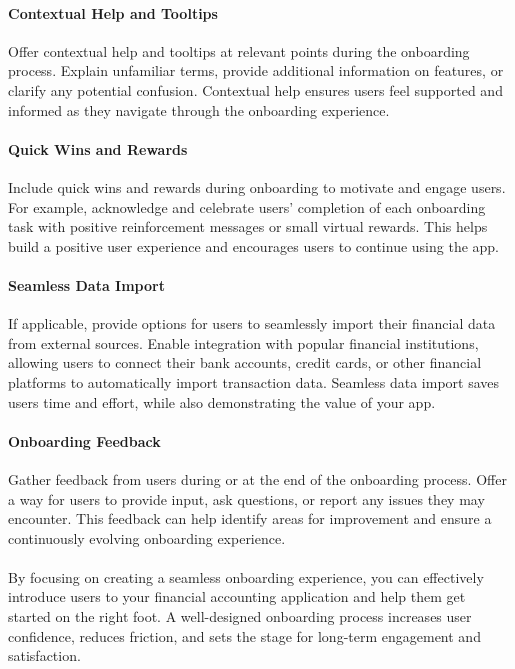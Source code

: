\paragraph{Contextual Help and Tooltips}
Offer contextual help and tooltips at relevant points during the onboarding process. 
Explain unfamiliar terms, provide additional information on features, or clarify any potential confusion. Contextual 
help ensures users feel supported and informed as they navigate through the onboarding experience.

\paragraph{Quick Wins and Rewards}
Include quick wins and rewards during onboarding to motivate and engage users. For example, 
acknowledge and celebrate users' completion of each onboarding task with positive reinforcement messages or small 
virtual rewards. This helps build a positive user experience and encourages users to continue using the app.

\paragraph{Seamless Data Import}
If applicable, provide options for users to seamlessly import their financial data from external 
sources. Enable integration with popular financial institutions, allowing users to connect their bank accounts, credit 
cards, or other financial platforms to automatically import transaction data. Seamless data import saves users time 
and effort, while also demonstrating the value of your app.

\paragraph{Onboarding Feedback}
Gather feedback from users during or at the end of the onboarding process. Offer a way for users 
to provide input, ask questions, or report any issues they may encounter. This feedback can help identify areas for 
improvement and ensure a continuously evolving onboarding experience.\\
\\

By focusing on creating a seamless onboarding experience, you can effectively introduce users to your financial 
accounting application and help them get started on the right foot. A well-designed onboarding process increases 
user confidence, reduces friction, and sets the stage for long-term engagement and satisfaction.


